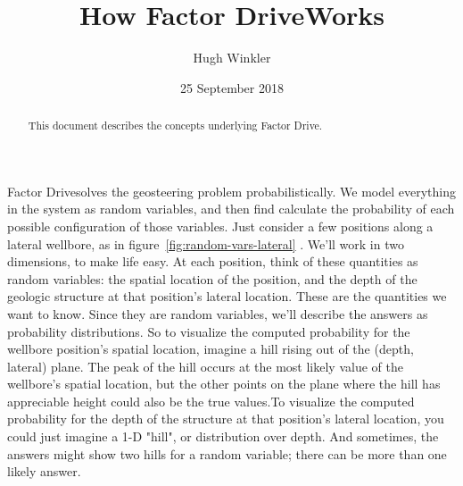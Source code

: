 \documentclass{tufte-handout}
\title{How Factor Drive\texttrademark Works}
\author[Hugh Winkler]{Hugh Winkler}
\date{25 September 2018}  %
\begin{document}
\maketitle%

\begin{abstract}
\noindent This document describes the concepts underlying Factor Drive\texttrademark. 
\end{abstract}


Factor Drive\texttrademark solves the geosteering problem probabilistically.
We model everything in the system as random variables, and then find 
calculate the probability of each possible configuration of those variables.
Just consider a few positions along a lateral wellbore, as in figure~\ref{fig:random-vars-lateral} . We'll work in
two dimensions, to make life easy. At each position,
think of these quantities as random variables: the spatial location
of the position, and the depth of the geologic structure at that position's lateral location.
These are the quantities we want to know. Since they are random variables, we'll describe the
answers as probability distributions. 
So to visualize the computed probability for the wellbore position's spatial location,
imagine a hill rising out of the (depth, lateral) plane. The peak of the hill occurs at the
most likely value of the wellbore's spatial location, but the other points on the plane where
the hill has appreciable height could also be the true values.To visualize the computed
probability for the depth of the structure at that position's lateral location, you could
just imagine a 1-D "hill", or distribution over depth. And sometimes, the answers might show
two hills for a random variable; there can be more than one likely answer.
\end{document}
